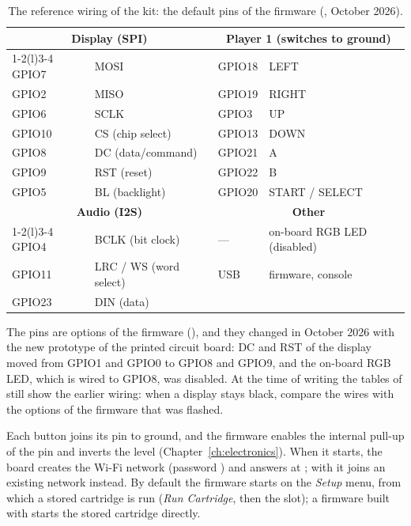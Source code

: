 \begin{table}[htb]
\centering\small
\caption{The reference wiring of the kit: the default pins of the firmware (, October 2026).}\label{tab:prg:pins}
\begin{tabular}{@{}ll@{\qquad\qquad}ll@{}}
\toprule
\multicolumn{2}{c}{\textbf{Display (SPI)}} & \multicolumn{2}{c}{\textbf{Player 1 (switches to ground)}}\\
\cmidrule(r){1-2}\cmidrule(l){3-4}
GPIO7 & MOSI & GPIO18 & LEFT\\
GPIO2 & MISO & GPIO19 & RIGHT\\
GPIO6 & SCLK & GPIO3 & UP\\
GPIO10 & CS (chip select) & GPIO13 & DOWN\\
GPIO8 & DC (data/command) & GPIO21 & A\\
GPIO9 & RST (reset) & GPIO22 & B\\
GPIO5 & BL (backlight) & GPIO20 & START / SELECT\\
\midrule
\multicolumn{2}{c}{\textbf{Audio (I2S)}} & \multicolumn{2}{c}{\textbf{Other}}\\
\cmidrule(r){1-2}\cmidrule(l){3-4}
GPIO4 & BCLK (bit clock) & --- & on-board RGB LED (disabled)\\
GPIO11 & LRC / WS (word select) & USB & firmware, console\\
GPIO23 & DIN (data) & & \\
\bottomrule
\end{tabular}
\end{table}

The pins are options of the firmware (), and they
changed in October 2026 with the new prototype of the printed circuit board:
DC and RST of the display moved from GPIO1 and GPIO0 to GPIO8 and GPIO9, and
the on-board RGB LED, which is wired to GPIO8, was disabled. At the time of
writing the tables of  still show the earlier
wiring: when a display stays black, compare the wires with the options of the
firmware that was flashed.

Each button joins its pin to ground, and the firmware enables the internal
pull-up of the pin and inverts the level (Chapter~\ref{ch:electronics}). When
it starts, the board creates the Wi-Fi network  (password
) and answers at ; with
 it joins an existing network instead. By default
the firmware starts on the \emph{Setup} menu, from which a stored cartridge is
run (\emph{Run Cartridge}, then the slot); a firmware built with
 starts the stored cartridge directly.

